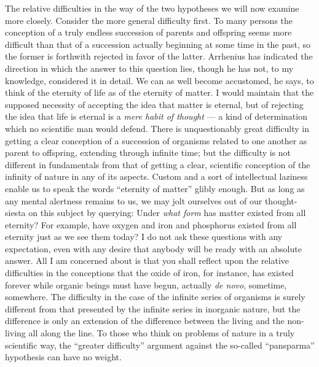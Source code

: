 \documentclass[a4paper, 11pt, oneside, polutonikogreek, english]{article}
\begin{document}
The relative difficulties in the way of the two hypotheses we will now examine more closely. Consider the more general difficulty first. To many persons the conception of a truly endless succession of parents and offspring seems more difficult than that of a succession actually beginning at some time in the past, so the former is forthwith rejected in favor of the latter. Arrhenius has indicated the direction in which the answer to this question lies, though he has not, to my knowledge, considered it in detail. We can as well become accustomed, he says, to think of the eternity of life as of the eternity of matter. I would maintain that the supposed necessity of accepting the idea that matter is eternal, but of rejecting the idea that life is eternal is a \emph{mere habit of thought} --- a kind of determination which no scientific man would defend. There is unquestionably great difficulty in getting a clear conception of a succession of organisms related to one another as parent to offspring, extending through infinite time; but the difficulty is not different in fundamentals from that of getting a clear, scientific conception of the infinity of nature in any of its aspects. Custom and a sort of intellectual laziness enable us to speak the words ``eternity of matter'' glibly enough. But as long as any mental alertness remains to us, we may jolt ourselves out of our thought-siesta on this subject by querying: Under \emph{what form} has matter existed from all eternity? For example, have oxygen and iron and phosphorus existed from all eternity just as we see them today? I do not ask these questions with any expectation, even with any desire that anybody will be ready with an absolute answer. All I am concerned about is that you shall reflect upon the relative difficulties in the conceptions that the oxide of iron, for instance, has existed forever while organic beings must have begun, actually \emph{de novo}, sometime, somewhere. The difficulty in the case of the infinite series of organisms is surely different from that presented by the infinite series in inorganic nature, but the difference is only an extension of the difference between the living and the non-living all along the line. To those who think on problems of nature in a truly scientific way, the ``greater difficulty'' argument against the so-called ``pansparma'' hypothesis can have no weight.
\end{document}
